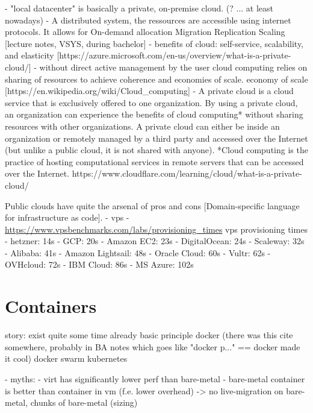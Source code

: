 - "local datacenter" is basically a private, on-premise cloud. (? ... at least nowadays)
- A distributed system, the ressources are accessible using internet protocols. It allows for
    On-demand allocation
    Migration
    Replication
    Scaling
  [lecture notes, VSYS, during bachelor]
- benefits of cloud:
  self-service, scalability, and elasticity
  [https://azure.microsoft.com/en-us/overview/what-is-a-private-cloud/]
- without direct active management by the user
  cloud computing relies on sharing of resources to achieve coherence and economies of scale. 
  economy of scale
  [https://en.wikipedia.org/wiki/Cloud_computing]
- A private cloud is a cloud service that is exclusively offered to one organization. By using a private cloud, an organization can
  experience the benefits of cloud computing* without sharing resources with other organizations.
  A private cloud can either be inside an organization or remotely managed by a third party and accessed over the Internet (but unlike a public cloud, it is not shared with anyone).
  *Cloud computing is the practice of hosting computational services in remote servers that can be accessed over the Internet.
  https://www.cloudflare.com/learning/cloud/what-is-a-private-cloud/

  Public clouds have quite the arsenal of pros and cons [Domain-specific language for infrastructure as code].
  - vps
  - \url{https://www.vpsbenchmarks.com/labs/provisioning_times}
    vps provisioning times
    - hetzner: 14s
    - GCP: 20s
    - Amazon EC2: 23s
    - DigitalOcean: 24s
    - Scaleway: 32s
    - Alibaba: 41s
    - Amazon Lightsail: 48s
    - Oracle Cloud: 60s
    - Vultr: 62s
    - OVHcloud: 72s
    - IBM Cloud: 86s
    - MS Azure: 102s

\section{Containers}
story:
exist quite some time already
basic principle
docker (there was this cite somewhere, probably in BA notes which goes like "docker p..." == docker made it cool)
docker swarm
kubernetes

- myths:
  - virt has significantly lower perf than bare-metal
  - bare-metal container is better than container in vm (f.e. lower overhead) -> no live-migration on bare-metal, chunks of bare-metal (sizing)

